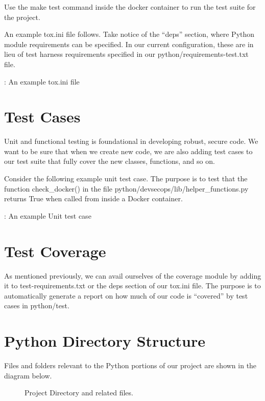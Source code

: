 \justify{}
Use the make test command inside the docker container to run the test suite for the project.

\justify{}
An example tox.ini file follows. Take notice of the ``deps'' section,
where Python module requirements can be specified. In our current configuration,
these are in lieu of test harness requirements specified in our
python/requirements-test.txt file.

\begin{mybox}{\thetcbcounter: An example tox.ini file}
  
\end{mybox}

\section{Test Cases}

\justify{}
Unit and functional testing is foundational in developing robust, secure
code. We want to be sure that when we create new code, we are also adding
test cases to our test suite that fully cover the new classes, functions, and so on.


\justify{}
Consider the following example unit test case. The purpose is to test
that the function check\_docker() in the file python/devsecops/lib/helper\_functions.py 
returns True when called from inside a Docker container.

\begin{mybox}{\thetcbcounter: An example Unit test case}
  
\end{mybox}

\section{Test Coverage}

\justify{}
As mentioned previously, we can avail ourselves of the coverage module by adding it to test-requirements.txt or the deps section of our tox.ini file.
The purpose is to automatically generate a report on how much of our code is ``covered'' by test cases in python/test.

\section{Python Directory Structure}
\justify{}
Files and folders relevant to the Python portions of our project are shown in the diagram below.

\begin{figure}[!htb]
  \centering
  
  \caption{Project Directory and related files.}
\label{pythonfiles}
\end{figure}
